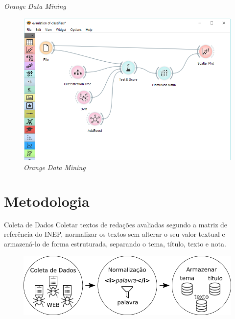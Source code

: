 \documentclass[10pt]{beamer}
\begin{document}
  \begin{frame}[fragile]{\textit{Orange Data Mining}}
    \begin{figure}[H]
    \begin{center}
        \includegraphics[scale=0.35]{images/orange_canvas.png}
    \end{center}
    \caption{\textit{Orange Data Mining}}
    \end{figure}
  \end{frame}



\section{Metodologia}
  \begin{frame}[fragile]{Coleta de Dados}
  Coletar textos de redações avaliadas segundo a matriz de referência do INEP, normalizar os textos sem alterar o seu valor textual e armazená-lo de forma estruturada, separando o tema, título, texto e nota.
  \begin{figure}[H]
  \begin{center}
      \includegraphics[scale=0.50]{images/methodology_1.png}
  \end{center}
  \end{figure}

  \end{frame}
\end{document}
